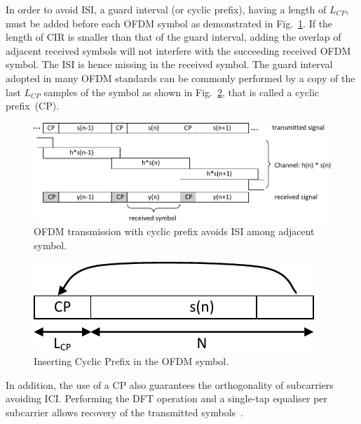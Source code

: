 In order to avoid ISI, a guard interval (or cyclic prefix), having a length of $L_{CP}$, must be added before each OFDM symbol as demonstrated in Fig.~\ref{fig:CIR-CP}.
If the length of CIR is smaller than that of the guard interval, adding the overlap of adjacent received symbols will not interfere with the succeeding received OFDM symbol.
The ISI is hence missing in the received symbol.
The guard interval adopted in many OFDM standards can be commonly performed by a copy of the last $L_{CP}$ samples of the symbol as shown in Fig.~\ref{fig:CP}, that is called a cyclic prefix~(CP).

\begin{figure}
	\centerline{\includegraphics [width=0.8\columnwidth] {Figures/CIR_CP.pdf} }
	\caption{OFDM transmission with cyclic prefix avoids ISI among adjacent symbol.}
	\label{fig:CIR-CP}
\end{figure}

\begin{figure}
	\centerline{\includegraphics [width=0.4\columnwidth] {Figures/CP.pdf} }
	\caption{Inserting Cyclic Prefix in the OFDM symbol.}
	\label{fig:CP}
\end{figure}

In addition, the use of a CP also guarantees the orthogonality of subcarriers avoiding ICI. Performing the DFT operation and a single-tap equaliser per subcarrier allows recovery of the transmitted symbols~\cite{farhang2008signal}.

